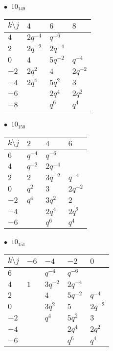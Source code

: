 %
\begin{minipage}{\linewidth}
$\bullet\ $ $10_{149}$ \vspace{0.5em} \\
\begin{tabular}{l|lll}
$k \setminus j$ & $4$ & $6$ & $8$ \\
\hline
$4$ & $2q^{-4}$ & $q^{-6}$ &  \\
$2$ & $2q^{-2}$ & $2q^{-4}$ &  \\
$0$ & $4$ & $5q^{-2}$ & $q^{-4}$ \\
$-2$ & $2q^{2}$ & $4$ & $2q^{-2}$ \\
$-4$ & $2q^{4}$ & $5q^{2}$ & $3$ \\
$-6$ &  & $2q^{4}$ & $2q^{2}$ \\
$-8$ &  & $q^{6}$ & $q^{4}$ \\
\end{tabular}
\vspace{2em}
\end{minipage}
%
\begin{minipage}{\linewidth}
$\bullet\ $ $10_{150}$ \vspace{0.5em} \\
\begin{tabular}{l|lll}
$k \setminus j$ & $2$ & $4$ & $6$ \\
\hline
$6$ & $q^{-4}$ & $q^{-6}$ &  \\
$4$ & $q^{-2}$ & $2q^{-4}$ &  \\
$2$ & $2$ & $3q^{-2}$ & $q^{-4}$ \\
$0$ & $q^{2}$ & $3$ & $2q^{-2}$ \\
$-2$ & $q^{4}$ & $3q^{2}$ & $2$ \\
$-4$ &  & $2q^{4}$ & $2q^{2}$ \\
$-6$ &  & $q^{6}$ & $q^{4}$ \\
\end{tabular}
\vspace{2em}
\end{minipage}
%
\begin{minipage}{\linewidth}
$\bullet\ $ $10_{151}$ \vspace{0.5em} \\
\begin{tabular}{l|llll}
$k \setminus j$ & $-6$ & $-4$ & $-2$ & $0$ \\
\hline
$6$ &  & $q^{-4}$ & $q^{-6}$ &  \\
$4$ & $1$ & $3q^{-2}$ & $2q^{-4}$ &  \\
$2$ &  & $4$ & $5q^{-2}$ & $q^{-4}$ \\
$0$ &  & $3q^{2}$ & $5$ & $2q^{-2}$ \\
$-2$ &  & $q^{4}$ & $5q^{2}$ & $3$ \\
$-4$ &  &  & $2q^{4}$ & $2q^{2}$ \\
$-6$ &  &  & $q^{6}$ & $q^{4}$ \\
\end{tabular}
\vspace{2em}
\end{minipage}
